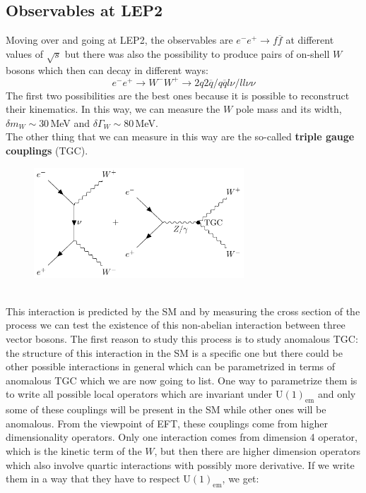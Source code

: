 \documentclass[../main.tex]{subfiles}
\begin{document}
\subsection{Observables at LEP2}
Moving over and going at LEP2, the observables are $e^-e^+\to f\overline{f}$ at different values of $\sqrt{s}$ but there was also the possibility to produce pairs of on-shell $W$ bosons which then can decay in different ways:
\[
e^-e^+\to W^-W^+\to2q2\overline{q}/q\overline{q}l\nu/ll\nu\nu
\]
The first two possibilities are the best ones because it is possible to reconstruct their kinematics. In this way, we can measure the $W$ pole mass and its width,
$\delta m_W\sim30$\,MeV and $\delta\Gamma_W\sim80$\,MeV.\\
The other thing that we can measure in this way are the so-called \textbf{triple gauge couplings} (TGC).
\begin{figure}[h]
    \centering
    \includegraphics[width=0.7\textwidth]{Images/TGC.pdf}
    \caption*{}
\end{figure}\\
This interaction is predicted by the SM and by measuring the cross section of the process we can test the existence of this non-abelian interaction between three vector bosons. The first reason to study this process is to study anomalous TGC: the structure of this interaction in the SM is a specific one but there could be other possible interactions in general which can be parametrized in terms of anomalous TGC which we are now going to list. One way to parametrize them is to write all possible local operators which are invariant under U$(1)_{\text{em}}$ and only some of these couplings will be present in the SM while other ones will be anomalous. From the viewpoint of EFT, these couplings come from higher dimensionality operators. Only one interaction comes from dimension 4 operator, which is the kinetic term of the $W$, but then there are higher dimension operators which also involve quartic interactions with possibly more derivative. If we write them in a way that they have to respect U$(1)_{\text{em}}$, we get:
\end{document}
